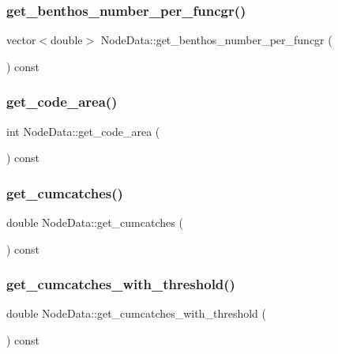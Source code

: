 \subsubsection{\texorpdfstring{get\_benthos\_number\_per\_funcgr()}{get\_benthos\_number\_per\_funcgr()}}
{\footnotesize\ttfamily vector$<$double$>$ Node\+Data\+::get\+\_\+benthos\+\_\+number\+\_\+per\+\_\+funcgr (\begin{DoxyParamCaption}{ }\end{DoxyParamCaption}) const\hspace{0.3cm}{\ttfamily [inline]}}

\mbox{\label{class_node_data_adf22932c2a5d4b38dabe1acbea605577}} 
\subsubsection{\texorpdfstring{get\_code\_area()}{get\_code\_area()}}
{\footnotesize\ttfamily int Node\+Data\+::get\+\_\+code\+\_\+area (\begin{DoxyParamCaption}{ }\end{DoxyParamCaption}) const\hspace{0.3cm}{\ttfamily [inline]}}

\mbox{\label{class_node_data_a72fdd0a26b6b8394848e85a35f3ffd6c}} 
\subsubsection{\texorpdfstring{get\_cumcatches()}{get\_cumcatches()}}
{\footnotesize\ttfamily double Node\+Data\+::get\+\_\+cumcatches (\begin{DoxyParamCaption}{ }\end{DoxyParamCaption}) const\hspace{0.3cm}{\ttfamily [inline]}}

\mbox{\label{class_node_data_af0c4f0aadd5269e87e146096aa319c9d}} 
\subsubsection{\texorpdfstring{get\_cumcatches\_with\_threshold()}{get\_cumcatches\_with\_threshold()}}
{\footnotesize\ttfamily double Node\+Data\+::get\+\_\+cumcatches\+\_\+with\+\_\+threshold (\begin{DoxyParamCaption}{ }\end{DoxyParamCaption}) const\hspace{0.3cm}{\ttfamily [inline]}}

